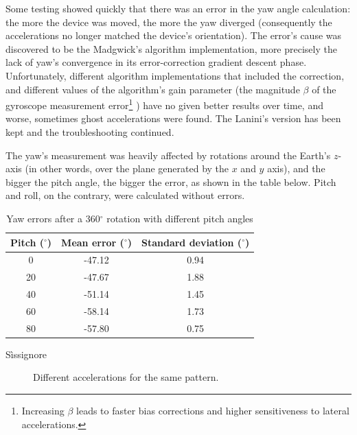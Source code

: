 Some testing showed quickly that there was an error in the yaw angle calculation: the more the device was moved, the more the yaw diverged (consequently the accelerations no longer matched the device's orientation). The error's cause was discovered to be the Madgwick's algorithm implementation, more precisely the lack of yaw's convergence in its error-correction gradient descent phase. Unfortunately, different algorithm implementations that included the correction, and different values of the algorithm's gain parameter (the magnitude $\beta$ of the gyroscope measurement error\footnote{Increasing $\beta$ leads to faster bias corrections and higher sensitiveness to lateral accelerations.} \cite[13]{Mad10}) have no given better results over time, and worse, sometimes ghost accelerations were found. The Lanini's version has been kept and the troubleshooting continued.
\bigbreak

The yaw's measurement was heavily affected by rotations around the Earth's $z$-axis (in other words, over the plane generated by the $x$ and $y$ axis), and the bigger the pitch angle, the bigger the error, as shown in the table below. Pitch and roll, on the contrary, were calculated without errors.
\bigbreak

\begin{table}[ht!]
	\centering
	\begin{tabular}{c|c c}
	\textbf{Pitch} ($^{\circ}$) & \textbf{Mean error} ($^{\circ}$) & \textbf{Standard deviation} ($^{\circ}$) \\ \hline
	0                           & -47.12                           & 0.94                                     \\
	20                          & -47.67                           & 1.88                                     \\
	40                          & -51.14                           & 1.45                                     \\
	60                          & -58.14                           & 1.73                                     \\
	80                          & -57.80                           & 0.75
	\end{tabular}
	\caption{Yaw errors after a 360$^{\circ}$ rotation with different pitch angles}
\end{table}

Sìssignore

\begin{center}
	\begin{figure}[ht!]
		\caption{Different accelerations for the same pattern.}
	\end{figure}
\end{center}

